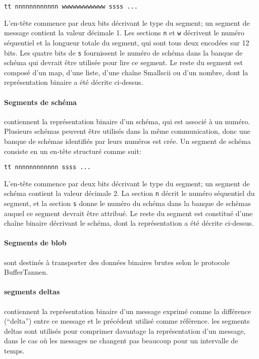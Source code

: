 \begin{verbatim}
tt nnnnnnnnnnnn wwwwwwwwwwww ssss ...
\end{verbatim}

L'en-tête commence par deux bits décrivant le type du segment; un segment de message contient la valeur décimale 1. Les sections \verb+n+ et \verb+w+ décrivent le numéro séquentiel et la longueur totale du segment, qui sont tous deux encodées sur 12 bits. Les quatre bits de \verb+s+ fournissent le numéro de schéma dans la banque de schéma qui devrait être utilisée pour lire ce segment. Le reste du segment est composé d'un map, d'une liste, d'une chaîne Smallscii ou d'un nombre, dont la représentation binaire a été décrite ci-dessus.

\paragraph{Segments de schéma} contiennent la représentation binaire d'un schéma, qui est associé à un numéro. Plusieurs schémas peuvent être utilisés dans la même communication, donc une banque de schémas identifiés par leurs numéros est crée. Un segment de schéma consiste en un en-tête structuré comme suit:

\begin{verbatim}
tt nnnnnnnnnnnn ssss ...
\end{verbatim}

L'en-tête commence par deux bits décrivant le type du segment; un segment de schéma contient la valeur décimale 2. La section \verb+n+ décrit le numéro séquentiel du segment, et la section \verb+s+ donne le numéro du schéma dans la banque de schémas auquel ce segment devrait être attribué. Le reste du segment est constitué d'une chaîne binaire décrivant le schéma, dont la représentation a été décrite ci-dessus.

\paragraph{Segments de blob} sont destinés à transporter des données binaires brutes selon le protocole BufferTannen.

\paragraph{segments deltas} contiennent la représentation binaire d'un message exprimé comme la différence (``delta'') entre ce message et le précédent utilisé comme référence. les segments deltas sont utilisés pour comprimer davantage la représentation d'un message, dans le cas où les messages ne changent pas beaucoup pour un intervalle de temps.

